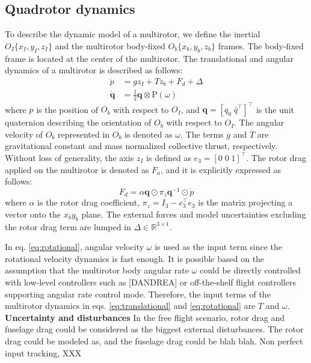 \documentclass[letterpaper, 10 pt, conference]{ieeeconf}  %
\begin{document}
\subsection{Quadrotor dynamics}
To describe the dynamic model of a multirotor, we define the inertial $O_I\{x_I,y_I,z_I\}$ and the multirotor body-fixed $O_b\{x_b,y_b,z_b\}$ frames. The body-fixed frame is located at the center of the multirotor. 
The translational and angular dynamics of a multirotor is described as follows:
\begin{align}
\ddot{p} &= gz_I + Tz_b + F_d + \Delta \label{eq:translational} \\
\dot{\textbf{q}} &= \textstyle{\frac{1}{2}}\textbf{q}\otimes \text{P}(\omega) \label{eq:rotational}
\end{align}
where $p$ is the position of $O_b$ with respect to $O_I$, and $\textbf{q} = [q_0\;\bar{q}^\top]^\top$ is the unit quaternion describing the orientation of $O_b$ with respect to $O_I$.
The angular velocity of $O_b$ represented in $O_b$ is denoted as $\omega$.
The terms $g$ and $T$ are gravitational constant and mass normalized collective thrust, respectively. 
Without loss of generality, the axis $z_I$ is defined as $e_3 = [0\;0\;1]^\top$.
The rotor drag applied on the multirotor is denoted as $F_a$, and it is explicitly expressed as follows:
\begin{equation}
F_d = \alpha\textbf{q}\odot\pi_z\textbf{q}^{-1}\odot \dot{p} \label{eq:rotorDrag}
\end{equation}
where $\alpha$ is the rotor drag coefficient, $\pi_z = I_3 - e_3^\top e_3$ is the matrix projecting a vector onto the $x_by_b$ plane.
The external forces and model uncertainties excluding the rotor drag term are lumped in $\Delta \in \mathbb{R}^{3\times 1}$. 

In eq. \eqref{eq:rotational}, angular velocity $\omega$ is used as the input term since the rotational velocity dynamics is fast enough. 
It is possible based on the assumption that the multirotor body angular rate $\omega$ could be directly controlled with low-level controllers such as [DANDREA] or off-the-shelf flight controllers supporting angular rate control mode.
Therefore, the input terms of the multirotor dynamics in eqs. \eqref{eq:translational} and \eqref{eq:rotational} are $T$ and $\omega$.
\\
\textbf{Uncertainty and disturbances}
In the free flight scenario, rotor drag and fuselage drag could be considered as the biggest external disturbances.
The rotor drag could be modeled as, and the fuselage drag could be blah blah.
Non perfect input tracking, XXX
\end{document}
